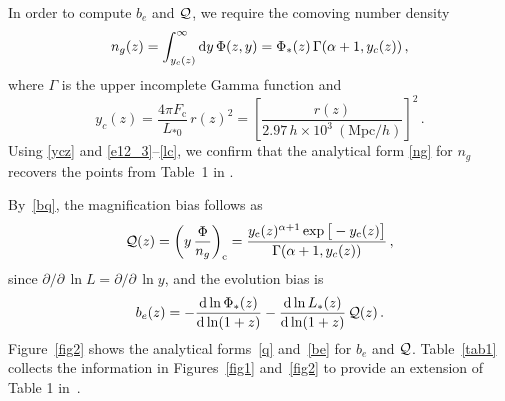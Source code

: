 In order to compute $b_{e}$ and $\mathcal{Q}$, we require the comoving number density
\begin{equation} \label{ng}
n_g(z)=\int_{y_c(z)}^\infty {\mathrm{d}y}\, \Phi(z,y) = \Phi_*(z) \, \Gamma({\alpha+1}, y_c(z)) \,,
\end{equation}
where $\Gamma$ is the upper incomplete Gamma function and
\begin{equation}  \label{ycz}
y_c(z) = \frac{4\pi F_{\mathrm{c}}}{L_{*0}}\, {r}(z)^2  = \left[ \frac{{r}(z)}{2.97\,h\times 10^3~ ({\mathrm{Mpc}}/h)}\right]^2 \,.
\end{equation}
Using \eqref{ycz} and \eqref{e12_3}--\eqref{lc},  we confirm that the analytical form \eqref{ng} for $n_g$ recovers the points from Table~1 in \cite{Yankelevich:2018uaz}. 

By~\eqref{bq}, the magnification bias follows as
\begin{equation} \label{q}
{\cal Q}(z) ={\left( y\, \frac{\Phi}{n_g}\right)_{\mathrm{c}}}= \frac{ y_{\mathrm{c}}(z)^{{\alpha+1}}\exp\big[-y_{\mathrm{c}}(z) \big]}{\Gamma({\alpha+1}, y_c(z))}\,,
\end{equation}
since {$\partial/\partial \,{\ln L} = \partial/\partial\, {\ln y}$}, and the evolution bias is
\begin{equation} \label{be}
b_e(z) = - \frac{\mathrm{d} \ln  \Phi_*(z)}{\mathrm{d} \ln (1+z)} - \frac{ {\mathrm{d} \ln L_*}(z)}{\mathrm{d} \ln (1+z)}\,{\cal Q}(z)\,.
\end{equation}
Figure~\ref{fig2} shows the analytical forms~\eqref{q} and~\eqref{be} for $b_{e}$ and $\mathcal{Q}$.  
Table~\ref{tab1} collects the information in Figures~\ref{fig1} and~\ref{fig2} to provide an extension of Table 1 in~\cite{Yankelevich:2018uaz}.
